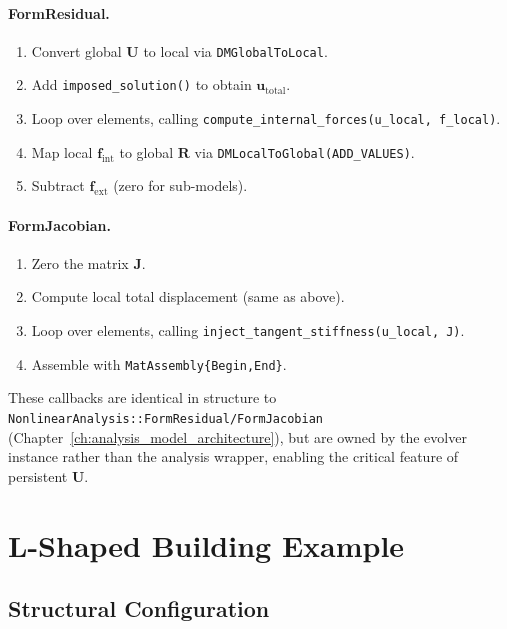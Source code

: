 \paragraph{FormResidual.}
\begin{enumerate}
  \item Convert global $\mathbf{U}$ to local via
        \texttt{DMGlobalToLocal}.
  \item Add \texttt{imposed\_solution()} to obtain
        $\mathbf{u}_{\mathrm{total}}$.
  \item Loop over elements, calling
        \texttt{compute\_internal\_forces(u\_local, f\_local)}.
  \item Map local $\mathbf{f}_{\mathrm{int}}$ to global
        $\mathbf{R}$ via \texttt{DMLocalToGlobal(ADD\_VALUES)}.
  \item Subtract $\mathbf{f}_{\mathrm{ext}}$ (zero for sub-models).
\end{enumerate}

\paragraph{FormJacobian.}
\begin{enumerate}
  \item Zero the matrix $\mathbf{J}$.
  \item Compute local total displacement (same as above).
  \item Loop over elements, calling
        \texttt{inject\_tangent\_stiffness(u\_local, J)}.
  \item Assemble with \texttt{MatAssembly\{Begin,End\}}.
\end{enumerate}

These callbacks are identical in structure to
\texttt{NonlinearAnalysis::FormResidual/FormJacobian}
(Chapter~\ref{ch:analysis_model_architecture}), but are owned by the
evolver instance rather than the analysis wrapper, enabling the
critical feature of persistent $\mathbf{U}$.


\section{L-Shaped Building Example}
\label{sec:nlevo-lshaped}

\subsection{Structural Configuration}
\label{ssec:nlevo-structure}

